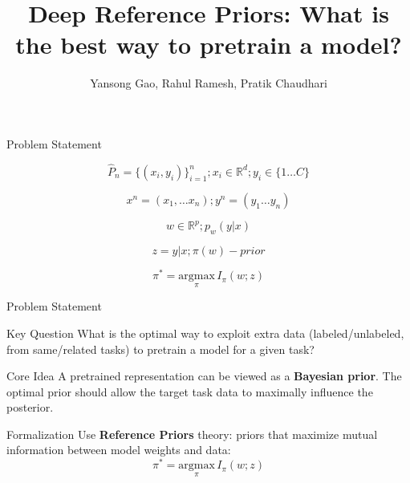 \documentclass{beamer}
\title[Deep Reference Priors]{Deep Reference Priors: What is the best way to pretrain a model?}
\author[Y. Gao et al.]{Yansong Gao, Rahul Ramesh, Pratik Chaudhari}
\date{\footnotesize

\par\bigskip\small Presented by: Papay Ivan}
\begin{document}
\begin{frame}
\thispagestyle{empty}
\maketitle
\end{frame}

\begin{frame}{Problem Statement}

\[\hat{P}_n=\{(x_i,y_i)\}_{i=1}^n;x_i \in \mathbb{R}^d;y_i \in \{1 \dots C\} \]

\[x^n=(x_1, \dots x_n); y^n=(y_1 \dots y_n) \]

\[
w \in \mathbb{R}^p; p_w(y|x)
\]

\[
z=y|x; \pi(w) - prior
\]


\[
\pi^* = \underset{\pi}{\mathrm{argmax}} \, I_{\pi}(w; z)
\]


\end{frame}

\begin{frame}{Problem Statement}

\begin{block}{Key Question}
What is the optimal way to exploit extra data (labeled/unlabeled, from same/related tasks) to pretrain a model for a given task?
\end{block}

\begin{block}{Core Idea}
A pretrained representation can be viewed as a \textbf{Bayesian prior}. The optimal prior should allow the target task data to maximally influence the posterior.
\end{block}

\begin{block}{Formalization}
Use \textbf{Reference Priors} theory: priors that maximize mutual information between model weights and data:
\[
\pi^* = \underset{\pi}{\mathrm{argmax}} \, I_{\pi}(w; z)
\]
\end{block}

\end{frame}
\end{document}
